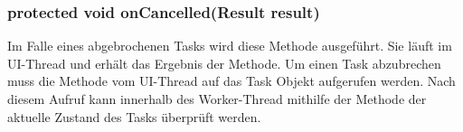 \subsubsection{protected void onCancelled(Result result)}
Im Falle eines abgebrochenen Tasks wird diese Methode ausgeführt. Sie läuft im UI-Thread und erhält das Ergebnis der  Methode. Um einen Task abzubrechen muss die  Methode vom UI-Thread auf das Task Objekt aufgerufen werden. Nach diesem Aufruf kann innerhalb des Worker-Thread mithilfe der  Methode der aktuelle Zustand des Tasks überprüft werden.\cite{36}
